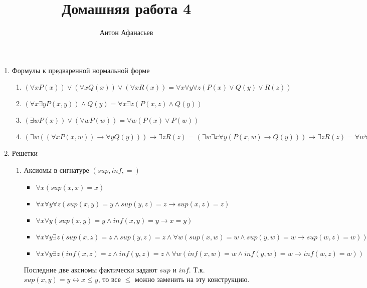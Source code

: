 \documentclass[10pt]{article}
\begin{document}
\title{Домашняя работа 4}
\author{Антон Афанасьев}
\maketitle

\begin{enumerate}
\item Формулы к предваренной нормальной форме
\begin{enumerate}
	\item $(\forall xP(x)) \lor (\forall xQ(x)) \lor (\forall xR(x)) = \forall x \forall y \forall z (P(x) \lor Q(y) \lor R(z))$
	\item $(\forall x\exists y P(x, y)) \land Q(y) = \forall x \exists z ( P(x,z) \land Q(y))$
	\item $(\exists w P(x)) \lor (\forall w P(w)) = \forall w (P(x) \lor P(w))$
	\item $(\exists w (( \forall x P(x, w)) \to \forall y Q(y))) \to \exists z R(z) = (\exists w \exists x \forall y (P(x, w) \to  Q(y))) \to \exists z R(z) = \forall w \forall x ((\forall y (P(x, w) \to  Q(y))) \to \exists y R(y)) = \forall w \forall x \exists y ((P(x, w) \to  Q(y)) \to R(y))$
\end{enumerate}

\item Решетки
\begin{enumerate}
	\item Аксиомы в сигнатуре $(sup, inf, =)$
	\begin{itemize}
		\item $\forall x (sup(x, x) = x)$
		\item $\forall x\forall y \forall z (sup(x,y) = y \land sup(y, z)=z \to sup(x, z)=z)$
		\item $\forall x \forall y (sup(x, y)=y \land inf(x, y)=y \to x=y)$
		\item $\forall x \forall y \exists z (sup(x, z)=z \land sup(y, z)=z \land \forall w (sup(x, w) = w \land sup(y, w)=w \to sup(w, z) =w))$
		\item $\forall x \forall y \exists z (inf(x, z)=z \land inf(y, z)=z \land \forall w (inf(x, w) = w \land inf(y, w)=w \to inf(w, z) = w))$
	\end{itemize}
	Последние две аксиомы фактически задают $sup$ и $inf$. Т.к. $sup(x, y)=y \leftrightarrow x \le y$, то все $\le$ можно заменить на эту конструкцию.


\end{enumerate}
\end{enumerate}
\end{document}
